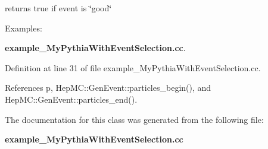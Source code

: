 returns true if event is \char`\"{}good\char`\"{} 

\begin{Desc}
\item[Examples: ]\par
{\bf example\_\-My\-Pythia\-With\-Event\-Selection.cc}.\end{Desc}


Definition at line 31 of file example\_\-My\-Pythia\-With\-Event\-Selection.cc.

References p, Hep\-MC::Gen\-Event::particles\_\-begin(), and Hep\-MC::Gen\-Event::particles\_\-end().

The documentation for this class was generated from the following file:\begin{CompactItemize}
\item 
{\bf example\_\-My\-Pythia\-With\-Event\-Selection.cc}\end{CompactItemize}

